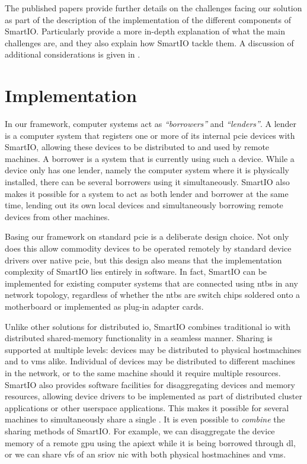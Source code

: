 The published papers provide further details on the challenges facing our solution as part of the description of the implementation of the different components of SmartIO.
%
Particularly  provide a more in-depth explanation of what the main challenges are, and they also explain how SmartIO tackle them.
%
A discussion of additional considerations is given in .



\section{Implementation}\label{sec:implementation}
In our framework, computer systems act as \emph{``\glspl{borrower}''} and \emph{``\glspl{lender}''}.
%
A \gls{lender} is a computer system that registers one or more of its internal \gls{pcie} devices with SmartIO, allowing these devices to be distributed to and used by remote machines.
%
A \gls{borrower} is a system that is currently using such a device. 
%
While a device only has one \gls{lender}, namely the computer system where it is physically installed, there can be several \glspl{borrower} using it simultaneously.
%
SmartIO also makes it possible for a system to act as both \gls{lender} and \gls{borrower} at the same time, lending out its own local devices and simultaneously borrowing remote devices from other machines.



Basing our framework on standard \gls{pcie} is a deliberate design choice.
%
Not only does this allow commodity devices to be operated remotely by standard device drivers over native \gls{pcie}, but this design also means that the implementation complexity of SmartIO lies entirely in software.
%
In fact, SmartIO can be implemented for existing computer systems that are connected using \glspl{ntb} in any network topology, regardless of whether the \glspl{ntb} are switch chips soldered onto a motherboard or implemented as plug-in adapter cards.



Unlike other solutions for distributed \gls{io}, SmartIO combines traditional \gls{io} with distributed shared-memory functionality in a seamless manner.
%
Sharing is supported at multiple levels:
%
devices may be distributed to physical \glspl{hostmachine} and to \glspl{vm} alike.
%
Individual  of  devices may be distributed to different machines in the network, or to the same machine should it require multiple resources.
%
SmartIO also provides software facilities for \gls{disaggregating} devices and memory resources, allowing device drivers to be implemented as part of distributed cluster applications or other \gls{userspace} applications. 
%
This makes it possible for several machines to simultaneously share a single .
%
It is even possible to \emph{combine} the sharing methods of SmartIO. 
%
For example, we can \gls{disaggregate} the device memory of a remote \gls{gpu} using the \gls{apiext} while it is being borrowed through \gls{dl}, or we can share \glspl{vf} of an \gls{sriov} \gls{nic} with both physical \glspl{hostmachine} and \glspl{vm}.


